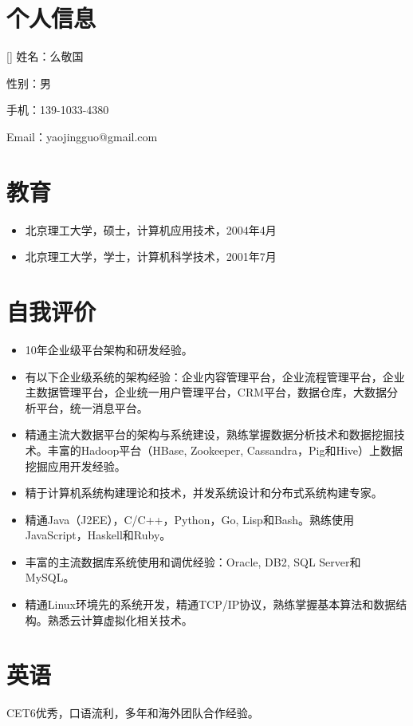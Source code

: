 \documentclass[a4paper]{article}
\newenvironment{DUlineblock}[1]{%
    \list{}{\setlength{\partopsep}{\parskip}
            \addtolength{\partopsep}{\baselineskip}
            \setlength{\topsep}{0pt}
            \setlength{\itemsep}{0.15\baselineskip}
            \setlength{\parsep}{0pt}
            \setlength{\leftmargin}{#1}}
    \raggedright
  }
  {\endlist}
\begin{document}
\begin{CJK}{UTF8}{gkai}

\section*{个人信息}

\begin{DUlineblock}{0em}
\item[] 姓名：么敬国
\item[] 性别：男
\item[] 手机：139-1033-4380
\item[] Email：yaojingguo@gmail.com
\end{DUlineblock}


\section*{教育}
\begin{itemize}
\item[] 北京理工大学，硕士，计算机应用技术，2004年4月
\item[] 北京理工大学，学士，计算机科学技术，2001年7月
\end{itemize}


\section*{自我评价}
\begin{itemize}
\item 10年企业级平台架构和研发经验。
\item 有以下企业级系统的架构经验：企业内容管理平台，企业流程管理平台，企业主数据管理平台，企业统一用户管理平台，CRM平台，数据仓库，大数据分析平台，统一消息平台。
\item 精通主流大数据平台的架构与系统建设，熟练掌握数据分析技术和数据挖掘技术。丰富的Hadoop平台（HBase, Zookeeper, Cassandra，Pig和Hive）上数据挖掘应用开发经验。
\item 精于计算机系统构建理论和技术，并发系统设计和分布式系统构建专家。
\item 精通Java（J2EE），C/C++，Python，Go, Lisp和Bash。熟练使用JavaScript，Haskell和Ruby。
\item 丰富的主流数据库系统使用和调优经验：Oracle, DB2, SQL Server和MySQL。
\item 精通Linux环境先的系统开发，精通TCP/IP协议，熟练掌握基本算法和数据结构。熟悉云计算虚拟化相关技术。
\end{itemize}

\section*{英语}
CET6优秀，口语流利，多年和海外团队合作经验。


\end{CJK}
\end{document}
